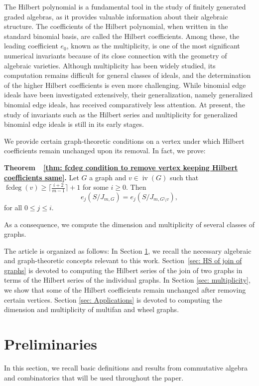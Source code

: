 \documentclass[12pt,reqno]{amsart}
\newcommand \iv{\operatorname{iv}}
\DeclareMathOperator{\fcdeg}{fcdeg}
\theoremstyle{plain}
\theoremstyle{definition}
\begin{document}
The Hilbert polynomial is a fundamental tool in the study of finitely generated graded algebras, as it provides valuable information about their algebraic structure. The coefficients of the Hilbert polynomial, when written in the standard binomial basis, are called the Hilbert coefficients. Among these, the leading coefficient $e_0$, known as the multiplicity, is one of the most significant numerical invariants because of its close connection with the geometry of algebraic varieties. Although multiplicity has been widely studied, its computation remains difficult for general classes of ideals, and the determination of the higher Hilbert coefficients is even more challenging. While binomial edge ideals have been investigated extensively, their generalization, namely generalized binomial edge ideals, has received comparatively less attention. At present, the study of invariants such as the Hilbert series and multiplicity for generalized binomial edge ideals is still in its early stages.

We provide certain graph-theoretic conditions on a vertex under which Hilbert coefficients remain unchanged upon its removal. In fact, we prove:

\medskip
    \noindent
    \textbf{Theorem~~\ref{thm: fcdeg condition to remove vertex keeping Hilbert coefficients same}.} 
 Let $G$ a graph and $v\in \iv(G)$ such that $\fcdeg(v)\geq \lceil\frac{i+2}{m-1}\rceil+1$ for some $i\geq 0$. Then $$e_j(S/J_{m,G})=e_j(S/J_{m,G\setminus v}),$$ for all $0\leq j\leq i.$

As a consequence, we compute the dimension and multiplicity of several classes of graphs. 

The article is organized as follows: In Section \ref{sec: Preliminaries}, we recall the necessary algebraic and graph-theoretic concepts relevant to this work. Section~\ref{sec: HS of join of graphs} is devoted to computing the Hilbert series of the join of two graphs in terms of the Hilbert series of the individual graphs. 
In Section \ref{sec: multiplicity}, we show that some of the Hilbert coefficients remain unchanged after removing certain vertices. Section \ref{sec: Applications} is devoted to computing the dimension and multiplicity of multifan and wheel graphs.
\section{Preliminaries}\label{sec: Preliminaries}
In this section, we recall basic definitions and results from commutative algebra and combinatorics that will be used throughout the paper.
\end{document}

